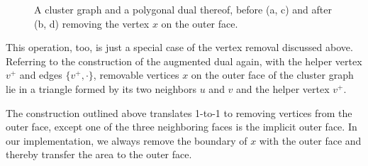 \begin{figure}[H]
	\centering
	\quad
	\qquad
	\quad
	\caption{A cluster graph and a polygonal dual thereof, before (a, c) and after (b, d) removing the vertex $x$ on the outer face.}
	\label{fig:remove-vertex-example-external}
\end{figure}

This operation, too, is just a special case of the vertex removal discussed above.
Referring to the construction of the augmented dual again, with the helper vertex $v^+$ and edges $\{v^+,\cdot\}$, removable vertices $x$ on the outer face of the cluster graph lie in a triangle formed by its two neighbors $u$ and $v$ and the helper vertex $v^+$.

The construction outlined above translates 1-to-1 to removing vertices from the outer face, except one of the three neighboring faces is the implicit outer face.
In our implementation, we always remove the boundary of $x$ with the outer face and thereby transfer the area to the outer face.

